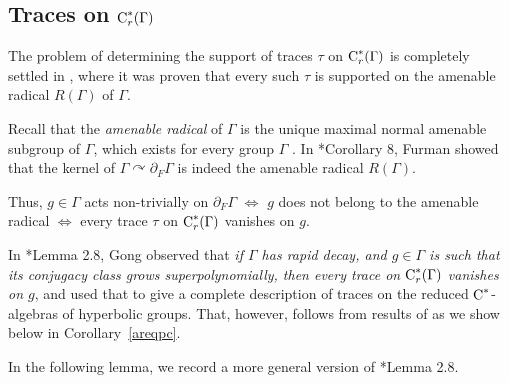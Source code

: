\documentclass[12pt]{amsart}
\theoremstyle{definition}
\theoremstyle{remark}
\newcommand{\act}{\curvearrowright}
\newcommand{\G}{\Gamma}
\begin{document}

\subsection*{Traces on \texorpdfstring{$\textup{C}^*_r(\G)$}{C*r(G)}}
The problem of determining the support of traces $\tau$ on $\textup{C}^*_r(\G)$ is completely settled in \cite{BKKO2017}, where it was proven that every such $\tau$ is supported on the amenable radical $R(\G)$ of $\G$.

Recall that the \textit{amenable radical} of $\Gamma$ is the unique maximal normal amenable subgroup of $\Gamma$, which exists for every group $\G$ \cite{Day}. In \cite{Furm}*{Corollary 8}, Furman showed that the kernel of $\G\act \partial_F\G$ is indeed the amenable radical $R(\G)$.

Thus, $g\in \G$ acts non-trivially on $\partial_F\G$ $\iff$ $g$ does not belong to the amenable radical $\iff$ every trace $\tau$ on $\textup{C}^*_r(\G)$ vanishes on $g$.

In \cite{gong2015}*{Lemma 2.8}, Gong observed that \emph{if $\G$ has rapid decay, and $g\in \G$ is such that its conjugacy class grows superpolynomially, then every trace on $\textup{C}^*_r(\Gamma)$ vanishes on $g$}, 
and used that to give a complete description of traces on the reduced $\textup{C}^*$-algebras of hyperbolic groups. That, however, follows from results of \cite{BKKO2017} as we show below in Corollary~\ref{areqpc}.  




In the following lemma, we record a more general version of \cite{gong2015}*{Lemma 2.8}.
\end{document}
